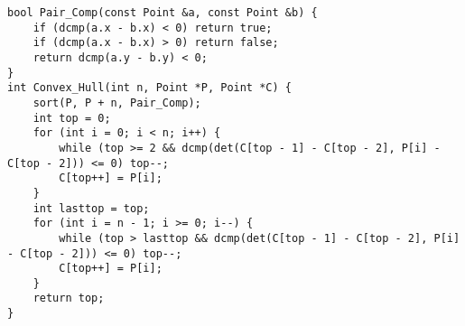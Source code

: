 \begin{lstlisting}
bool Pair_Comp(const Point &a, const Point &b) {
	if (dcmp(a.x - b.x) < 0) return true;
	if (dcmp(a.x - b.x) > 0) return false;
	return dcmp(a.y - b.y) < 0;
}
int Convex_Hull(int n, Point *P, Point *C) {
	sort(P, P + n, Pair_Comp);
	int top = 0;
	for (int i = 0; i < n; i++) {
		while (top >= 2 && dcmp(det(C[top - 1] - C[top - 2], P[i] - C[top - 2])) <= 0) top--;
		C[top++] = P[i];
	}
	int lasttop = top;
	for (int i = n - 1; i >= 0; i--) {
		while (top > lasttop && dcmp(det(C[top - 1] - C[top - 2], P[i] - C[top - 2])) <= 0) top--;
		C[top++] = P[i];
	}
	return top;
}
\end{lstlisting}

